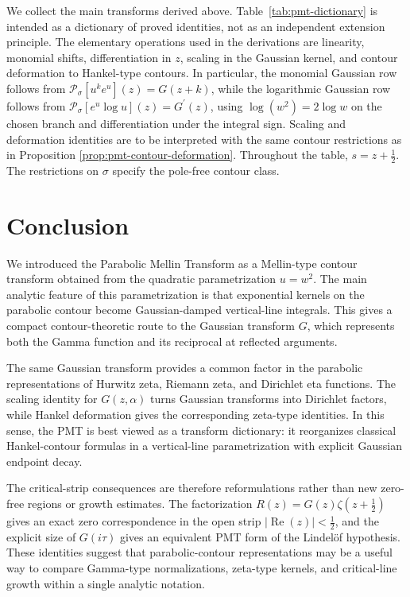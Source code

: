 \documentclass[12pt,english]{article}
\theoremstyle{plain} %
\theoremstyle{remark} %
\begin{document}
We collect the main transforms derived above. Table~\ref{tab:pmt-dictionary} is intended as a dictionary of proved identities, not as an independent extension principle.
The elementary operations used in the derivations are linearity, monomial shifts, differentiation in $z$, scaling in the Gaussian kernel, and contour deformation to Hankel-type contours. In particular, the monomial Gaussian row
follows from $\mathcal{P}_\sigma[u^k e^u](z)=G(z+k)$, while the logarithmic Gaussian row follows from $\mathcal{P}_\sigma[e^u\log u](z)=G^\prime(z)$, using
$\log(w^2)=2\log w$ on the chosen branch and differentiation under the integral sign. Scaling and deformation identities are to be interpreted with the same contour restrictions as in Proposition \ref{prop:pmt-contour-deformation}.
Throughout the table, $s=z+\tfrac{1}{2}$. The restrictions on $\sigma$ specify the pole-free contour class.


\section{Conclusion}
\label{sec:conclusion}

We introduced the Parabolic Mellin Transform as a Mellin-type contour transform obtained from the quadratic parametrization $u=w^2$. The main analytic feature of this parametrization is that exponential kernels on the parabolic contour become Gaussian-damped vertical-line integrals. This gives a compact contour-theoretic route to the Gaussian transform $G$, which represents both the Gamma function and its reciprocal at reflected arguments.

The same Gaussian transform provides a common factor in the parabolic representations of Hurwitz zeta, Riemann zeta, and Dirichlet eta functions. The scaling identity for $G(z,\alpha)$ turns Gaussian transforms into Dirichlet factors, while Hankel deformation gives the corresponding zeta-type identities. In this sense, the PMT is best viewed as a transform dictionary: it reorganizes classical Hankel-contour formulas in a vertical-line parametrization with explicit Gaussian endpoint decay.

The critical-strip consequences are therefore reformulations rather than new zero-free regions or growth estimates. The factorization $R(z)=G(z)\zeta(z+\tfrac{1}{2})$ gives an exact zero correspondence in the open strip $|\operatorname{Re}(z)|<\tfrac{1}{2}$, and the explicit size of $G(i\tau)$ gives an equivalent PMT form of the Lindel\"of hypothesis. These identities suggest that parabolic-contour representations may be a useful way to compare Gamma-type normalizations, zeta-type kernels, and critical-line growth within a single analytic notation.
\end{document}
